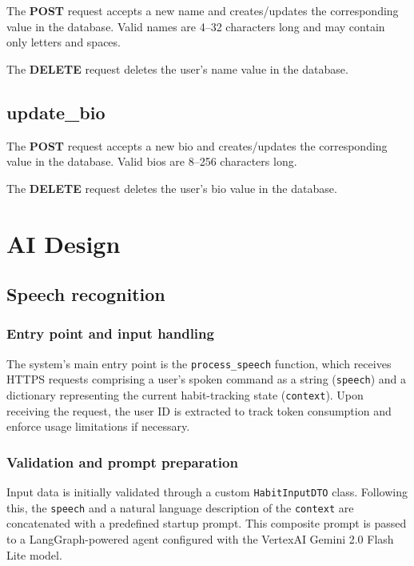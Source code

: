 \documentclass{article}
\newcommand{\newpar}[0]{\vspace{2mm}\noindent}
\begin{document}
The \textbf{POST} request accepts a new name and creates/updates the corresponding value in the database.
Valid names are 4–32 characters long and may contain only letters and spaces.

\newpar
The \textbf{DELETE} request deletes the user's name value in the database.

\subsection{update\_bio}

The \textbf{POST} request accepts a new bio and creates/updates the corresponding value in the database.
Valid bios are 8–256 characters long.

\newpar
The \textbf{DELETE} request deletes the user's bio value in the database.

\section{AI Design}

\subsection{Speech recognition}

\subsubsection{Entry point and input handling}

The system's main entry point is the \verb|process_speech| function, which receives HTTPS requests comprising a user’s spoken command as a string (\verb|speech|) and a dictionary representing the current habit-tracking state (\verb|context|).
Upon receiving the request, the user ID is extracted to track token consumption and enforce usage limitations if necessary.

\subsubsection{Validation and prompt preparation}

Input data is initially validated through a custom \verb|HabitInputDTO| class.
Following this, the \verb|speech| and a natural language description of the \verb|context| are concatenated with a predefined startup prompt.
This composite prompt is passed to a LangGraph-powered agent configured with the VertexAI Gemini 2.0 Flash Lite model.
\end{document}
